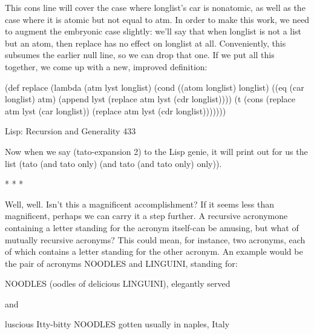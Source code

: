 This cons line will cover the case where longlist's car is nonatomic, as well as the
case where it is atomic but not equal to atm. In order to make this work, we need to
augment the embryonic case slightly: we'll say that when longlist is not a list but an
atom, then replace has no effect on longlist at all. Conveniently, this subsumes the
earlier null line, so we can drop that one. If we put all this together, we come up with
a new, improved definition:

(def replace (lambda (atm lyst longlist)
       (cond ((atom longlist) longlist)
               ((eq (car longlist) atm)
               (append lyst (replace atm lyst (cdr longlist))))
               (t (cons (replace atm lyst (car longlist))
                       (replace atm lyst (cdr longlist)))))))




Lisp: Recursion and Generality                                                      433

Now when we say (tato-expansion 2) to the Lisp genie, it will print out for us the list
(tato (and tato only) (and tato (and tato only) only)).

                                       *   *   *

       Well, well. Isn't this a magnificent accomplishment? If it seems less than
magnificent, perhaps we can carry it a step further. A recursive acronymone
containing a letter standing for the acronym itself-can be amusing, but what of
mutually recursive acronyms? This could mean, for instance, two acronyms, each of
which contains a letter standing for the other acronym. An example would be the pair
of acronyms NOODLES and LINGUINI, standing for:

       NOODLES (oodles of delicious LINGUINI), elegantly served

                                     and

       luscious Itty-bitty NOODLES gotten usually in naples, Italy

